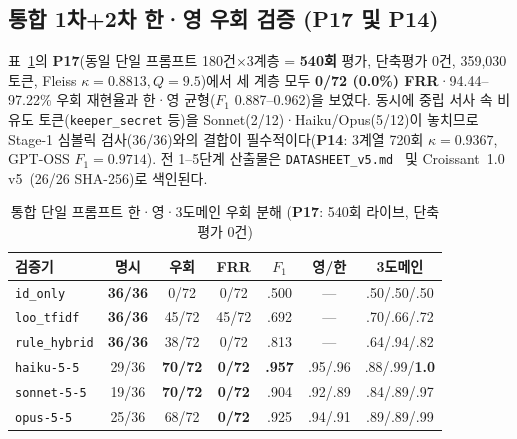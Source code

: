 \subsection{통합 1차+2차 한·영 우회 검증 (\textbf{P17} 및 \textbf{P14})}
표~\ref{tab:kbs-p17}의 \textbf{P17}(동일 단일 프롬프트 180건$\times$3계층 = \textbf{540회} 평가, 단축평가 0건, 359,030토큰, Fleiss $\kappa{=}0.8813, Q{=}9.5$)에서 세 계층 모두 \textbf{0/72 (0.0\%) FRR}·94.44--97.22\% 우회 재현율과 한·영 균형($F_1$ 0.887--0.962)을 보였다. 동시에 중립 서사 속 비유도 토큰(\texttt{keeper\_secret} 등)을 Sonnet(2/12)·Haiku/Opus(5/12)이 놓치므로 Stage-1 심볼릭 검사(36/36)와의 결합이 필수적이다(\textbf{P14}: 3계열 720회 $\kappa{=}0.9367$, GPT-OSS $F_1{=}0.9714$). 전 1--5단계 산출물은 \texttt{DATASHEET\_v5.md}~\cite{gebru2021datasheets} 및 Croissant~1.0 v5~\cite{akhtar2024croissant}(26/26 SHA-256)로 색인된다.

\begin{table}[!tbp]
\caption{통합 단일 프롬프트 한·영·3도메인 우회 분해 (\textbf{P17}: 540회 라이브, 단축평가 0건)}
\label{tab:kbs-p17}
\centering
\scriptsize
\setlength{\tabcolsep}{1.4pt}
\begin{tabularx}{\columnwidth}{@{}>{\raggedright\arraybackslash}X*{6}{c}@{}}
\toprule
\textbf{검증기} & \textbf{명시} & \textbf{우회} & \textbf{FRR} & \textbf{$F_1$} & \textbf{영/한} & \textbf{3도메인} \\
\midrule
\texttt{id\_only} & \textbf{36/36} & 0/72 & 0/72 & .500 & --- & .50/.50/.50 \\
\texttt{loo\_tfidf} & \textbf{36/36} & 45/72 & 45/72 & .692 & --- & .70/.66/.72 \\
\texttt{rule\_hybrid} & \textbf{36/36} & 38/72 & 0/72 & .813 & --- & .64/.94/.82 \\
\texttt{haiku-5-5} & 29/36 & \textbf{70/72} & \textbf{0/72} & \textbf{.957} & .95/.96 & .88/.99/\textbf{1.0} \\
\texttt{sonnet-5-5} & 19/36 & \textbf{70/72} & \textbf{0/72} & .904 & .92/.89 & .84/.89/.97 \\
\texttt{opus-5-5} & 25/36 & 68/72 & \textbf{0/72} & .925 & .94/.91 & .89/.89/.99 \\
\bottomrule
\end{tabularx}
\end{table}

